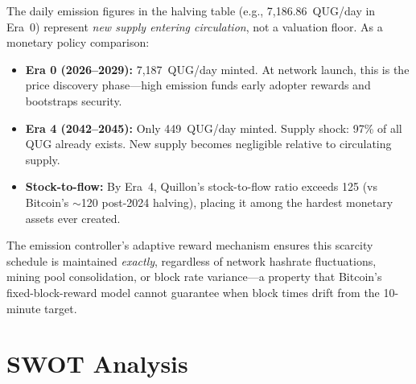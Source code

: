\documentclass[11pt,a4paper]{article}
\begin{document}
The daily emission figures in the halving table (e.g., 7,186.86~QUG/day in Era~0) represent \emph{new supply entering circulation}, not a valuation floor. As a monetary policy comparison:

\begin{itemize}[leftmargin=*]
    \item \textbf{Era 0 (2026--2029):} 7,187~QUG/day minted. At network launch, this is the price discovery phase---high emission funds early adopter rewards and bootstraps security.
    \item \textbf{Era 4 (2042--2045):} Only 449~QUG/day minted. Supply shock: 97\% of all QUG already exists. New supply becomes negligible relative to circulating supply.
    \item \textbf{Stock-to-flow:} By Era~4, Quillon's stock-to-flow ratio exceeds 125 (vs Bitcoin's $\sim$120 post-2024 halving), placing it among the hardest monetary assets ever created.
\end{itemize}

The emission controller's adaptive reward mechanism ensures this scarcity schedule is maintained \emph{exactly}, regardless of network hashrate fluctuations, mining pool consolidation, or block rate variance---a property that Bitcoin's fixed-block-reward model cannot guarantee when block times drift from the 10-minute target.

\section{SWOT Analysis}
\end{document}
